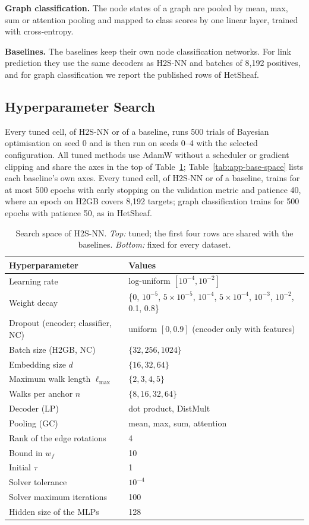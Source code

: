 \documentclass{article}
\newcommand{\method}{\textsc{H2S-NN}}
\begin{document}
\textbf{Graph classification.} The node states of a graph are pooled by mean, max, sum or attention pooling and mapped to class scores by one linear layer, trained with cross-entropy.

\textbf{Baselines.} The baselines keep their own node classification networks. For link prediction they use the same decoders as \method{} and batches of 8{,}192 positives, and for graph classification we report the published rows of HetSheaf.


\subsection{Hyperparameter Search}
Every tuned cell, of \method{} or of a baseline, runs 500 trials of Bayesian optimisation on seed 0 and is then run on seeds 0--4 with the selected configuration. All tuned methods use AdamW without a scheduler or gradient clipping and share the axes in the top of Table~\ref{tab:app-space}; Table~\ref{tab:app-base-space} lists each baseline's own axes. Every tuned cell, of \method{} or of a baseline, trains for at most 500 epochs with early stopping on the validation metric and patience 40, where an epoch on H2GB covers 8{,}192 targets; graph classification trains for 500 epochs with patience 50, as in HetSheaf.

\begin{table}[!htbp]
  \centering
  \caption{Search space of \method{}. \emph{Top:} tuned; the first four rows are shared with the baselines. \emph{Bottom:} fixed for every dataset.}
  \label{tab:app-space}
  \scriptsize
  \setlength{\tabcolsep}{3pt}
  \begin{tabular}{p{}p{}}
    \toprule
    Hyperparameter & Values \\
    \midrule
    Learning rate & log-uniform $[10^{-4},10^{-2}]$ \\
    Weight decay & \{0, $10^{-5}$, $5{\times}10^{-5}$, $10^{-4}$, $5{\times}10^{-4}$, $10^{-3}$, $10^{-2}$, 0.1, 0.8\} \\
    Dropout (encoder; classifier, NC) & uniform $[0,0.9]$ (encoder only with features) \\
    Batch size (H2GB, NC) & $\{32,256,1024\}$ \\
    Embedding size $d$ & $\{16,32,64\}$ \\
    Maximum walk length $\ell_{\max}$ & $\{2,3,4,5\}$ \\
    Walks per anchor $n$ & $\{8,16,32,64\}$ \\
    Decoder (LP) & dot product, DistMult \\
    Pooling (GC) & mean, max, sum, attention \\
    \midrule
    Rank of the edge rotations & 4 \\
    Bound in $w_f$ & 10 \\
    Initial $\tau$ & 1 \\
    Solver tolerance & $10^{-4}$ \\
    Solver maximum iterations & 100 \\
    Hidden size of the MLPs & 128 \\
    \bottomrule
  \end{tabular}
\end{table}
\end{document}
